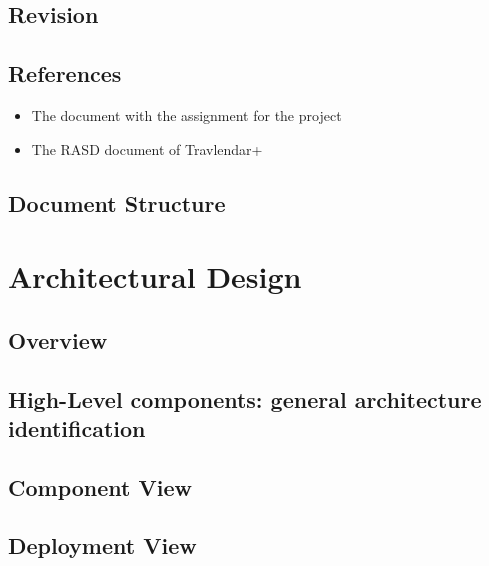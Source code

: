 \documentclass{article}
\begin{document}
\subsection{Revision}




\subsection{References}
\begin{itemize}
	\item The document with the assignment for the project
	\item The RASD document of Travlendar+
\end{itemize}
\subsection{Document Structure}


\clearpage
\section{Architectural Design}

\subsection{Overview}\label{overview}


\clearpage
\subsection{High-Level components: general architecture identification}\label{higharch}


\clearpage

\subsection{Component View}\label{componentview}

\clearpage

\clearpage

\clearpage

\clearpage
\subsection{Deployment View}\label{deploymentview}

\clearpage
\end{document}
